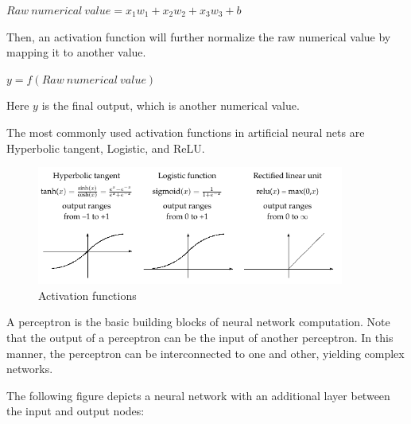 \documentclass[final]{ua-thesis}
\numberwithin{equation}{section}
\begin{document}
\begin{exe}
\ex $Raw\ numerical\ value= x_{1}w_{1}+x_{2}w_{2}+x_{3}w_{3}+b$
\end{exe}

Then, an activation function will further normalize the raw numerical value by mapping it to another value. 

\begin{exe}
\ex $y=f(Raw\ numerical\ value)$
\end{exe}

Here $y$ is the final output, which is another numerical value. 

The most commonly used activation functions in artificial neural nets are Hyperbolic tangent, Logistic, and ReLU.

\begin{figure}
\caption{Activation functions}
\centering
\includegraphics[width=0.9\textwidth]{activation_function.png}
\end{figure} 

A perceptron is the basic building blocks of neural network computation. Note that the output of a perceptron can be the input of another perceptron. 
In this manner, the perceptron can be interconnected to one and other, yielding complex networks. 

The following figure depicts a neural network with an additional layer between the input and output nodes:
\end{document}

